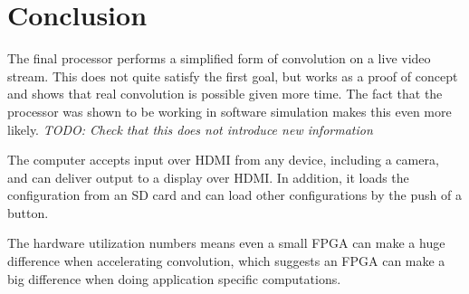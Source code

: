 \section{Conclusion}
The final processor performs a simplified form of convolution on a live video stream.
This does not quite satisfy the first goal,
but works as a proof of concept and shows that real convolution is possible given more time.
The fact that the processor was shown to be working in software simulation makes this even more likely.
\emph{TODO: Check that this does not introduce new information}

The computer accepts input over HDMI from any device, including a camera, and can deliver output to a display over HDMI.
In addition,
it loads the configuration from an SD card and can load other configurations by the push of a button.

The hardware utilization numbers means even a small FPGA can make a huge difference when accelerating convolution,
which suggests an FPGA can make a big difference when doing application specific computations.
